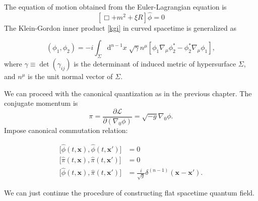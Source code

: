 \documentclass[12pt]{article}
\numberwithin{equation}{subsection}
\theoremstyle{mystyle}{\newtheorem{definition}{Definition}[subsection]}
\theoremstyle{mystyle}{\newtheorem{theorem}[definition]{Theorem}}
\theoremstyle{mystyle}{\newtheorem*{remark}{Remark}}
\theoremstyle{mystyle}{\newtheorem{example}{Example}[subsection]}
\theoremstyle{mystyle}{\newtheorem{examples}{Examples}[subsection]}
\theoremstyle{mystyle}{\newtheorem{cthm}{}[subsection]}
\newcommand{\p}{\partial}
\newcommand{\id}{\mathrm{d}}
\begin{document}
The equation of motion obtained from the Euler-Lagrangian equation is
\begin{equation}
  \left[\Box+m^2+\xi R\right]\hat{\phi}=0
\end{equation}
The Klein-Gordon inner product \ref{kgi} in curved spacetime is generalized as
\begin{definition}
  \[(\phi_1,\phi_2)=-i\int_{\Sigma}\id^{n-1}x\;\sqrt{\gamma}n^{\mu}\left[\phi_1\nabla_\mu\phi^*_2-\phi_2^*\nabla_\mu\phi_1\right],\]
  where \(\gamma\equiv \det(\gamma_{ij})\) is the determinant of induced metric of hypersurface \(\Sigma\),
  and \(n^{\mu}\) is the unit normal vector of \(\Sigma\).
\end{definition}

We can proceed with the canonical quantization as in the previous chapter.
The conjugate momentum is
\begin{equation}
  \pi=\frac{\p \mathcal{L}}{\p(\nabla_{0}\phi)}=\sqrt{-g}\nabla_{0}\phi.
\end{equation}
Impose canonical commutation relation:
\begin{cthm}\label{cccr}
  \begin{align*}
    \bigl[\hat{\phi}(t,\mathbf{x}),\hat{\phi}(t,\mathbf{x'})\bigr] & =0                                                          \\
    \bigl[\hat{\pi}(t,\mathbf{x}),\hat{\pi}(t,\mathbf{x'})\bigr]   & =0                                                          \\
    \bigl[\hat{\phi}(t,\mathbf{x}),\hat{\pi}(t,\mathbf{x'})\bigr]  & =\frac{i}{\sqrt{g}}\delta^{(n-1)}(\mathbf{x}-\mathbf{x'}).
  \end{align*}
\end{cthm}
We can just continue the procedure of constructing flat spacetime quantum field.
\end{document}
